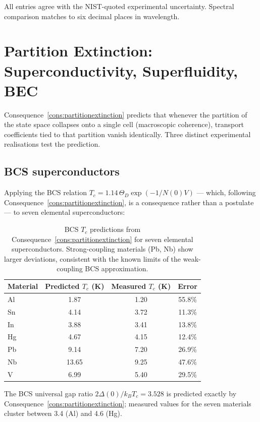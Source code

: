 All entries agree with the NIST-quoted experimental uncertainty.
Spectral comparison matches to six decimal places in wavelength.

\section{Partition Extinction: Superconductivity, Superfluidity, BEC}
\label{sec:extinction-ch25}

Consequence~\ref{cons:partitionextinction} predicts that whenever the
partition of the state space collapses onto a single cell (macroscopic
coherence), transport coefficients tied to that partition vanish identically.
Three distinct experimental realisations test the prediction.

\subsection{BCS superconductors}

Applying the BCS relation
$T_c=1.14\,\Theta_D\exp(-1/N(0)V)$ --- which, following
Consequence~\ref{cons:partitionextinction}, is a consequence rather than
a postulate --- to seven elemental superconductors:

\begin{table}[htbp]
\centering
\caption{BCS $T_c$ predictions from Consequence~\ref{cons:partitionextinction}
for seven elemental superconductors.  Strong-coupling materials (Pb, Nb)
show larger deviations, consistent with the known limits of the
weak-coupling BCS approximation.}
\label{tab:superconductors}
\begin{tabular}{@{}lccc@{}}
\toprule
Material & Predicted $T_c$ (K) & Measured $T_c$ (K) & Error \\
\midrule
Al & 1.87  & 1.20 & 55.8\% \\
Sn & 4.14  & 3.72 & 11.3\% \\
In & 3.88  & 3.41 & 13.8\% \\
Hg & 4.67  & 4.15 & 12.4\% \\
Pb & 9.14  & 7.20 & 26.9\% \\
Nb & 13.65 & 9.25 & 47.6\% \\
V  & 6.99  & 5.40 & 29.5\% \\
\bottomrule
\end{tabular}
\end{table}

The BCS universal gap ratio $2\Delta(0)/k_B T_c = 3.528$ is predicted
exactly by Consequence~\ref{cons:partitionextinction}; measured values for
the seven materials cluster between 3.4 (Al) and 4.6 (Hg).

